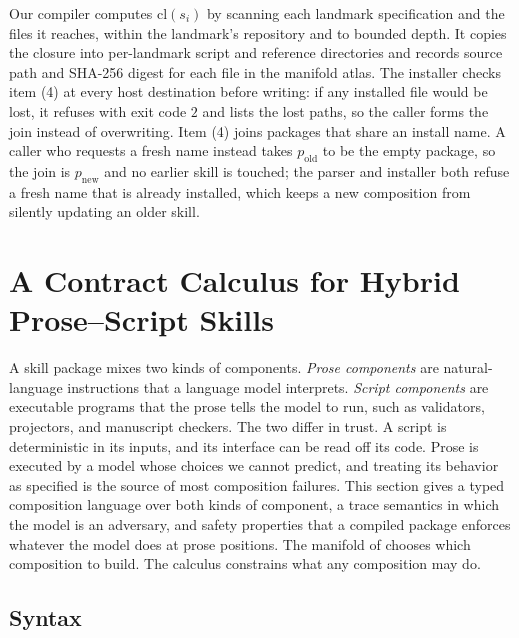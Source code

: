 \documentclass[11pt]{article}
\theoremstyle{definition}
\theoremstyle{plain}
\begin{document}
Our compiler computes $\mathrm{cl}(s_i)$ by scanning each landmark specification and the files it reaches, within the landmark's repository and to bounded depth. It copies the closure into per-landmark script and reference directories and records source path and SHA-256 digest for each file in the manifold atlas. The installer checks item (4) at every host destination before writing: if any installed file would be lost, it refuses with exit code $2$ and lists the lost paths, so the caller forms the join instead of overwriting. Item (4) joins packages that share an install name. A caller who requests a fresh name instead takes $p_{\mathrm{old}}$ to be the empty package, so the join is $p_{\mathrm{new}}$ and no earlier skill is touched; the parser and installer both refuse a fresh name that is already installed, which keeps a new composition from silently updating an older skill.

\section{A Contract Calculus for Hybrid Prose--Script Skills}
\label{sec:calculus}

A skill package mixes two kinds of components. \emph{Prose components} are natural-language instructions that a language model interprets. \emph{Script components} are executable programs that the prose tells the model to run, such as validators, projectors, and manuscript checkers. The two differ in trust. A script is deterministic in its inputs, and its interface can be read off its code. Prose is executed by a model whose choices we cannot predict, and treating its behavior as specified is the source of most composition failures. This section gives a typed composition language over both kinds of component, a trace semantics in which the model is an adversary, and safety properties that a compiled package enforces whatever the model does at prose positions. The manifold of  chooses which composition to build. The calculus constrains what any composition may do.

\subsection{Syntax}
\label{subsec:syntax}
\end{document}
